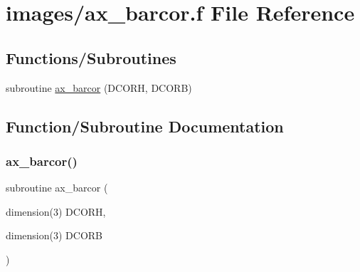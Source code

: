 \hypertarget{ax__barcor_8f}{}\section{images/ax\+\_\+barcor.f File Reference}
\label{ax__barcor_8f}
\subsection*{Functions/\+Subroutines}
\begin{DoxyCompactItemize}
\item 
subroutine \hyperlink{ax__barcor_8f_aa3fdd74fdd1e92a2e565df3472ce568d}{ax\+\_\+barcor} (D\+C\+O\+RH, D\+C\+O\+RB)
\end{DoxyCompactItemize}


\subsection{Function/\+Subroutine Documentation}
\mbox{\label{ax__barcor_8f_aa3fdd74fdd1e92a2e565df3472ce568d}} 
\subsubsection{\texorpdfstring{ax\+\_\+barcor()}{ax\_barcor()}}
{\footnotesize\ttfamily subroutine ax\+\_\+barcor (\begin{DoxyParamCaption}\item[{dimension(3)}]{D\+C\+O\+RH,  }\item[{dimension(3)}]{D\+C\+O\+RB }\end{DoxyParamCaption})}

